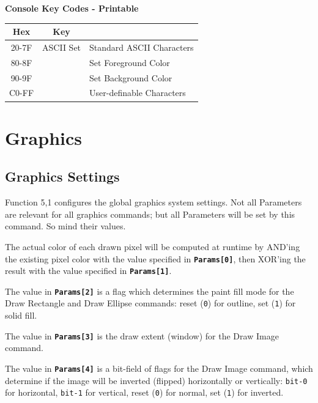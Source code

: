 \documentclass[12pt]{article}
\newcommand{\MonoSp}[1] {\fontsize{10pt}{10pt}\selectfont\texttt{#1}\normalsize}
\newcommand{\HeaderCenter}[1] {\makecell[tc]{\textbf{#1}}}
\newcommand{\Param}[1] {\textbf{\texttt{Params[#1]}}}
\begin{document}
\begin{table}[h]
\centering\textbf{Console Key Codes - Printable}        \\
\begin{tabular}{ | c | c | l | }                           \hline
\textbf{Hex} & \textbf{Key} & \HeaderCenter{Output}     \\ \hline
20-7F        & ASCII Set    & Standard ASCII Characters \\ \hline
80-8F        &              & Set Foreground Color      \\ \hline
90-9F        &              & Set Background Color      \\ \hline
C0-FF        &              & User-definable Characters \\ \hline
\end{tabular}
\end{table}


\pagebreak


\section{Graphics}\label{graphics}

\subsection{Graphics Settings}\label{subsec:graphics-settings}

Function 5,1 configures the global graphics system settings.
Not all Parameters are relevant for all graphics commands;
but all Parameters will be set by this command. So mind their values.
\newline

The actual color of each drawn pixel will be computed at runtime
by AND'ing the existing pixel color with the value specified in \Param{0},
then XOR'ing the result with the value specified in \Param{1}.
\newline

The value in \Param{2} is a flag which determines the paint fill mode
for the Draw Rectangle and Draw Ellipse commands:
reset (\MonoSp{0}) for outline, set (\MonoSp{1}) for solid fill.
\newline

The value in \Param{3} is the draw extent (window) for the Draw Image command.
\newline

The value in \Param{4} is a bit-field of flags for the Draw Image command,
which determine if the image will be inverted (flipped) horizontally or vertically:
\MonoSp{bit-0} for horizontal, \MonoSp{bit-1} for vertical,
reset (\MonoSp{0}) for normal, set (\MonoSp{1}) for inverted.
\newline
\end{document}
